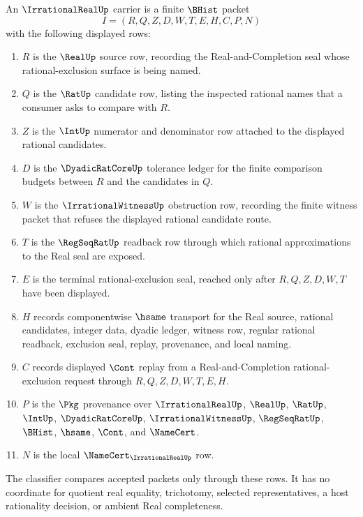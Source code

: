 \begin{definition}
\label{def:irrational-real-carrier}
An $\IrrationalRealUp$ carrier is a finite $\BHist$ packet
$$
I=(R,Q,Z,D,W,T,E,H,C,P,N)
$$
with the following displayed rows:
\begin{enumerate}
\item $R$ is the $\RealUp$ source row, recording the Real-and-Completion seal whose rational-exclusion surface is being named.
\item $Q$ is the $\RatUp$ candidate row, listing the inspected rational names that a consumer asks to compare with $R$.
\item $Z$ is the $\IntUp$ numerator and denominator row attached to the displayed rational candidates.
\item $D$ is the $\DyadicRatCoreUp$ tolerance ledger for the finite comparison budgets between $R$ and the candidates in $Q$.
\item $W$ is the $\IrrationalWitnessUp$ obstruction row, recording the finite witness packet that refuses the displayed rational candidate route.
\item $T$ is the $\RegSeqRatUp$ readback row through which rational approximations to the Real seal are exposed.
\item $E$ is the terminal rational-exclusion seal, reached only after $R,Q,Z,D,W,T$ have been displayed.
\item $H$ records componentwise $\hsame$ transport for the Real source, rational candidates, integer data, dyadic ledger, witness row, regular rational readback, exclusion seal, replay, provenance, and local naming.
\item $C$ records displayed $\Cont$ replay from a Real-and-Completion rational-exclusion request through $R,Q,Z,D,W,T,E,H$.
\item $P$ is the $\Pkg$ provenance over $\IrrationalRealUp$, $\RealUp$, $\RatUp$, $\IntUp$, $\DyadicRatCoreUp$, $\IrrationalWitnessUp$, $\RegSeqRatUp$, $\BHist$, $\hsame$, $\Cont$, and $\NameCert$.
\item $N$ is the local $\NameCert_{\IrrationalRealUp}$ row.
\end{enumerate}
The classifier compares accepted packets only through these rows. It has no coordinate for quotient real equality, trichotomy, selected representatives, a host rationality decision, or ambient Real completeness.
\end{definition}

